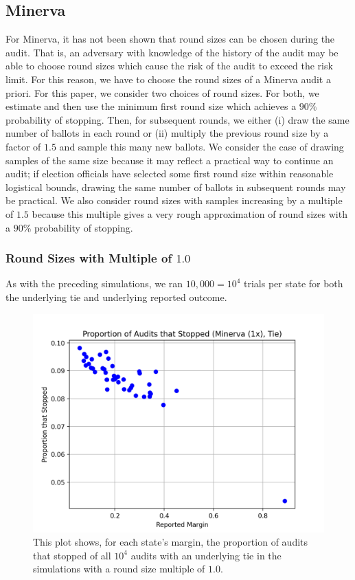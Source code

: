\documentclass[runningheads]{llncs}
\begin{document}
\subsection{Minerva}
For Minerva, it has not been shown that round sizes can be chosen
during the audit. That is, an adversary with knowledge of the history
of the audit may be able to choose round sizes which cause the 
risk of the audit to exceed the risk limit.
For this reason, we have to choose the round sizes of a Minerva 
audit a priori.
For this paper, we consider two choices of round sizes.
For both, we estimate and then use the minimum first round size 
which achieves
a $90\%$ probability of stopping.
Then, for subsequent rounds, we either (i) 
draw the same number of ballots in each round or (ii)
multiply the previous round size by a factor of $1.5$ and 
sample this many new ballots.
We consider the case of drawing samples of the same size
because it may reflect a practical way to continue an
audit; if election officials have selected some first round size within
reasonable logistical bounds, drawing the same number of 
ballots in subsequent rounds may be practical.
We also consider round sizes with samples increasing by a multiple
of $1.5$ because this multiple gives a very rough approximation of 
round sizes with a $90\%$ probability of stopping.

\subsubsection{Round Sizes with Multiple of $1.0$}

As with the preceding simulations, we ran $10,000=10^4$ trials
per state for both the underlying tie and underlying reported
outcome.

\begin{figure}
\includegraphics[width=\textwidth]{minerva_multiround_1x_10^4/total_risk.png}
\caption{This plot shows, for each state's margin, the proportion of audits that stopped of
all $10^4$ audits with an underlying tie in the simulations with a round size multiple of $1.0$.}
\label{fig:minerva1_risk}
\end{figure}
\end{document}
